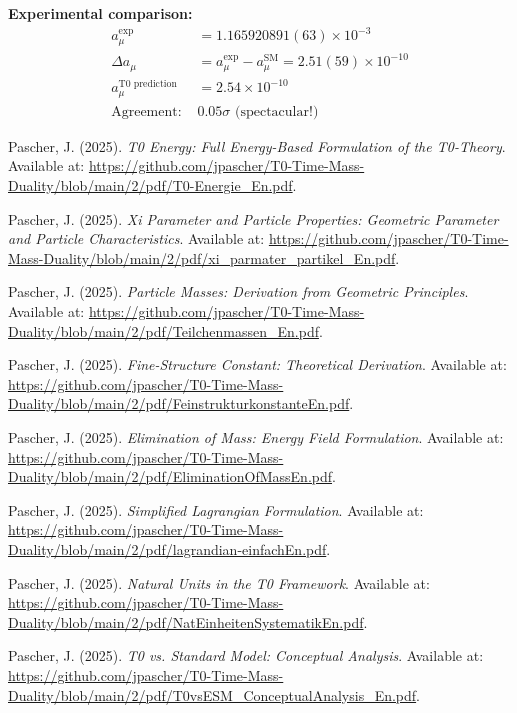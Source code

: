\documentclass[12pt,a4paper]{article}
\numberwithin{equation}{section}
\begin{document}
	\textbf{Experimental comparison:}
	\begin{align}
		a_\mu^{\exp} &= 1.165920891(63) \times 10^{-3}\\
		\Delta a_\mu &= a_\mu^{\exp} - a_\mu^{\text{SM}} = 2.51(59) \times 10^{-10}\\
		a_\mu^{\text{T0 prediction}} &= 2.54 \times 10^{-10}\\
		\text{Agreement: } &0.05\sigma \text{ (spectacular!)}
		\label{eq:muon_comparison}
	\end{align}
	
	\begin{thebibliography}{99}
		
		Pascher, J. (2025). \emph{T0 Energy: Full Energy-Based Formulation of the T0-Theory}. Available at: \url{https://github.com/jpascher/T0-Time-Mass-Duality/blob/main/2/pdf/T0-Energie_En.pdf}.
		
		Pascher, J. (2025). \emph{Xi Parameter and Particle Properties: Geometric Parameter and Particle Characteristics}. Available at: \url{https://github.com/jpascher/T0-Time-Mass-Duality/blob/main/2/pdf/xi_parmater_partikel_En.pdf}.
		
		Pascher, J. (2025). \emph{Particle Masses: Derivation from Geometric Principles}. Available at: \url{https://github.com/jpascher/T0-Time-Mass-Duality/blob/main/2/pdf/Teilchenmassen_En.pdf}.
		
		Pascher, J. (2025). \emph{Fine-Structure Constant: Theoretical Derivation}. Available at: \url{https://github.com/jpascher/T0-Time-Mass-Duality/blob/main/2/pdf/FeinstrukturkonstanteEn.pdf}.
		
		Pascher, J. (2025). \emph{Elimination of Mass: Energy Field Formulation}. Available at: \url{https://github.com/jpascher/T0-Time-Mass-Duality/blob/main/2/pdf/EliminationOfMassEn.pdf}.
		
		Pascher, J. (2025). \emph{Simplified Lagrangian Formulation}. Available at: \url{https://github.com/jpascher/T0-Time-Mass-Duality/blob/main/2/pdf/lagrandian-einfachEn.pdf}.
		
		Pascher, J. (2025). \emph{Natural Units in the T0 Framework}. Available at: \url{https://github.com/jpascher/T0-Time-Mass-Duality/blob/main/2/pdf/NatEinheitenSystematikEn.pdf}.
		
		Pascher, J. (2025). \emph{T0 vs. Standard Model: Conceptual Analysis}. Available at: \url{https://github.com/jpascher/T0-Time-Mass-Duality/blob/main/2/pdf/T0vsESM_ConceptualAnalysis_En.pdf}.
		

\end{thebibliography}
\end{document}
